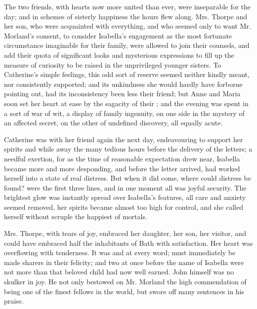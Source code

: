 The two friends, with hearts now more united than ever, were inseparable for the day; and in schemes of sisterly happiness the hours flew along. Mrs. Thorpe and her son, who were acquainted with everything, and who seemed only to want Mr. Morland's consent, to consider Isabella's engagement as the most fortunate circumstance imaginable for their family, were allowed to join their counsels, and add their quota of significant looks and mysterious expressions to fill up the measure of curiosity to be raised in the unprivileged younger sisters. To Catherine's simple feelings, this odd sort of reserve seemed neither kindly meant, nor consistently supported; and its unkindness she would hardly have forborne pointing out, had its inconsistency been less their friend; but Anne and Maria soon set her heart at ease by the sagacity of their ; and the evening was spent in a sort of war of wit, a display of family ingenuity, on one side in the mystery of an affected secret, on the other of undefined discovery, all equally acute.

Catherine was with her friend again the next day, endeavouring to support her spirits and while away the many tedious hours before the delivery of the letters; a needful exertion, for as the time of reasonable expectation drew near, Isabella became more and more desponding, and before the letter arrived, had worked herself into a state of real distress. But when it did come, where could distress be found?  were the first three lines, and in one moment all was joyful security. The brightest glow was instantly spread over Isabella's features, all care and anxiety seemed removed, her spirits became almost too high for control, and she called herself without scruple the happiest of mortals.

Mrs. Thorpe, with tears of joy, embraced her daughter, her son, her visitor, and could have embraced half the inhabitants of Bath with satisfaction. Her heart was overflowing with tenderness. It was  and  at every word;  must immediately be made sharers in their felicity; and two  at once before the name of Isabella were not more than that beloved child had now well earned. John himself was no skulker in joy. He not only bestowed on Mr. Morland the high commendation of being one of the finest fellows in the world, but swore off many sentences in his praise.

